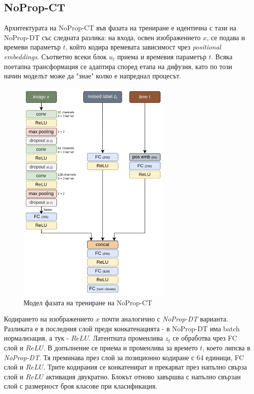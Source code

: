\documentclass[a4paper,11pt]{article}
\begin{document}
\subsection{NoProp-CT}
Архитектурата на NoProp-CT във фазата на трениране е идентична с тази на NoProp-DT със следната разлика: на входа, освен изображението \(x\), се подава и времеви параметър \(t\), който кодира времевата зависимост чрез \emph{positional embeddings}. Съответно всеки блок \(u_{t}\) приема и времевия параметър \(t\). Всяка поетапна трансформация се адаптира според етапа на дифузия, като по този начин моделът може да "знае" колко е напреднал процесът.
\begin{figure}[H]
    \centering
    \includegraphics[width=3.00in,keepaspectratio]{images/NoProp-CT Model.png}
    \caption{Модел фазата на трениране на NoProp-CT}
\end{figure}


Кодирането на изображението \(x\) почти аналогично с \emph{NoProp-DT} варианта. Разликата е в последния слой преди конкатенацията - в NoProp-DT има batch нормализация, а тук - \(ReLU\). Латентната променлива \(z_t\) се обработва чрез FC слой и \(ReLU\). В допълнение се приема и променлива за времето \(t\), което липсва в \emph{NoProp-DT}. Тя преминава през слой за позиционно кодиране с 64 единици, FC слой и \(ReLU\). Трите кодирания се конкатенират и прекарват през напълно свърза слой и \(ReLU\) активация двукратно. Блокът отново завършва с напълно свързан слой с размерност броя класове при класификация.
\end{document}
